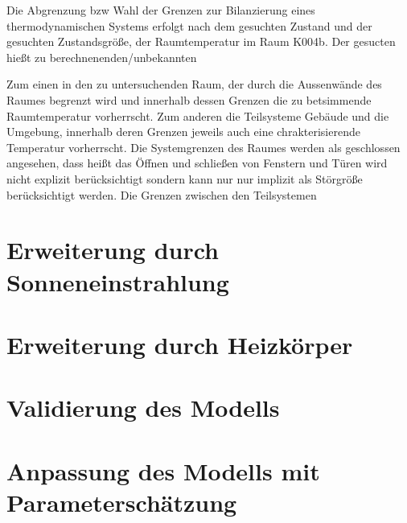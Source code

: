 

Die Abgrenzung bzw Wahl der Grenzen zur Bilanzierung eines thermodynamischen Systems erfolgt nach dem gesuchten Zustand und der gesuchten Zustandsgröße, der Raumtemperatur im Raum K004b. Der gesucten hießt zu berechnenenden/unbekannten

Zum einen in den zu untersuchenden Raum, der durch die Aussenwände des Raumes begrenzt wird und innerhalb dessen Grenzen die zu betsimmende Raumtemperatur vorherrscht. Zum anderen die Teilsysteme Gebäude und die Umgebung, innerhalb deren Grenzen jeweils auch eine chrakterisierende Temperatur vorherrscht. Die Systemgrenzen des Raumes werden als geschlossen angesehen, dass heißt das Öffnen und schließen von Fenstern und Türen wird nicht explizit berücksichtigt sondern kann nur nur implizit als Störgröße berücksichtigt werden. Die Grenzen zwischen den Teilsystemen 


\section{Erweiterung durch Sonneneinstrahlung}


\section{Erweiterung durch Heizkörper}

\section{Validierung des Modells}

\section{Anpassung des Modells mit Parameterschätzung}